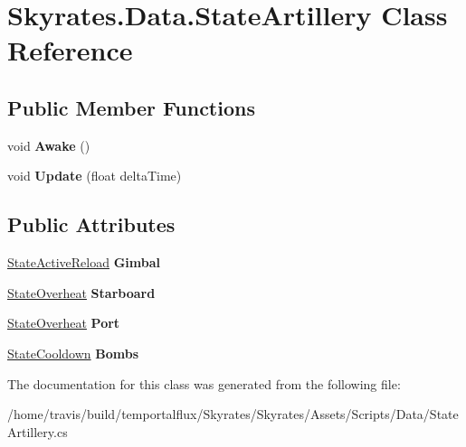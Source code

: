\hypertarget{class_skyrates_1_1_data_1_1_state_artillery}{\section{Skyrates.\-Data.\-State\-Artillery Class Reference}
\label{class_skyrates_1_1_data_1_1_state_artillery}
}
\subsection*{Public Member Functions}
\begin{DoxyCompactItemize}
\item 
\hypertarget{class_skyrates_1_1_data_1_1_state_artillery_a27b8448bfadba4abee5f0ac618bccad9}{void {\bfseries Awake} ()}\label{class_skyrates_1_1_data_1_1_state_artillery_a27b8448bfadba4abee5f0ac618bccad9}

\item 
\hypertarget{class_skyrates_1_1_data_1_1_state_artillery_abf0da323cf2a611c474b023c25c3895f}{void {\bfseries Update} (float delta\-Time)}\label{class_skyrates_1_1_data_1_1_state_artillery_abf0da323cf2a611c474b023c25c3895f}

\end{DoxyCompactItemize}
\subsection*{Public Attributes}
\begin{DoxyCompactItemize}
\item 
\hypertarget{class_skyrates_1_1_data_1_1_state_artillery_a6bb24342380db95bc7ca435bf143175c}{\hyperlink{class_skyrates_1_1_misc_1_1_state_active_reload}{State\-Active\-Reload} {\bfseries Gimbal}}\label{class_skyrates_1_1_data_1_1_state_artillery_a6bb24342380db95bc7ca435bf143175c}

\item 
\hypertarget{class_skyrates_1_1_data_1_1_state_artillery_a2dde97010bf9eab4c1537231e2c5d433}{\hyperlink{class_skyrates_1_1_misc_1_1_state_overheat}{State\-Overheat} {\bfseries Starboard}}\label{class_skyrates_1_1_data_1_1_state_artillery_a2dde97010bf9eab4c1537231e2c5d433}

\item 
\hypertarget{class_skyrates_1_1_data_1_1_state_artillery_a8f4401a53c2862f8cea695ca7133a458}{\hyperlink{class_skyrates_1_1_misc_1_1_state_overheat}{State\-Overheat} {\bfseries Port}}\label{class_skyrates_1_1_data_1_1_state_artillery_a8f4401a53c2862f8cea695ca7133a458}

\item 
\hypertarget{class_skyrates_1_1_data_1_1_state_artillery_aa993c508fc5331d7f3b3870f72a2d386}{\hyperlink{class_skyrates_1_1_misc_1_1_state_cooldown}{State\-Cooldown} {\bfseries Bombs}}\label{class_skyrates_1_1_data_1_1_state_artillery_aa993c508fc5331d7f3b3870f72a2d386}

\end{DoxyCompactItemize}


The documentation for this class was generated from the following file\-:\begin{DoxyCompactItemize}
\item 
/home/travis/build/temportalflux/\-Skyrates/\-Skyrates/\-Assets/\-Scripts/\-Data/State\-Artillery.\-cs\end{DoxyCompactItemize}
